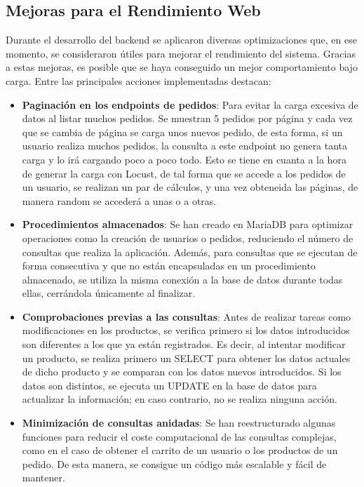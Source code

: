 \documentclass[10pt]{book}
\begin{document}
\subsection{Mejoras para el Rendimiento Web}
Durante el desarrollo del backend se aplicaron diversas optimizaciones que, en ese momento, se consideraron útiles para mejorar el rendimiento del sistema. Gracias a estas mejoras, es posible que se haya conseguido un mejor comportamiento bajo carga. Entre las principales acciones implementadas destacan:

\begin{itemize}
    \item \textbf{Paginación en los endpoints de pedidos}: Para evitar la carga excesiva de datos al listar muchos pedidos. Se muestran 5 pedidos por página y cada vez que se cambia de página se carga unos nuevos pedido, de esta forma, si un usuario realiza muchos pedidos, la consulta a este endpoint no genera tanta carga y lo irá cargando poco a poco todo. Esto se tiene en cuanta a la hora de generar la carga con Locust, de tal forma que se accede a los pedidos de un usuario, se realizan un par de cálculos, y una vez obteneida las páginas, de manera random se accederá a unas o a otras.
    \item \textbf{Procedimientos almacenados}: Se han creado en MariaDB para optimizar operaciones como la creación de usuarios o pedidos, reduciendo el número de consultas que realiza la aplicación. Además, para consultas que se ejecutan de forma consecutiva y que no están encapsuladas en un procedimiento almacenado, se utiliza la misma conexión a la base de datos durante todas ellas, cerrándola únicamente al finalizar.
    \item \textbf{Comprobaciones previas a las consultas}: Antes de realizar tareas como modificaciones en los productos, se verifica primero si los datos introducidos son diferentes a los que ya están registrados. Es decir, al intentar modificar un producto, se realiza primero un SELECT para obtener los datos actuales de dicho producto y se comparan con los datos nuevos introducidos. Si los datos son distintos, se ejecuta un UPDATE en la base de datos para actualizar la información; en caso contrario, no se realiza ninguna acción.
    \item \textbf{Minimización de consultas anidadas}: Se han reestructurado algunas funciones para reducir el coste computacional de las consultas complejas, como en el caso de obtener el carrito de un usuario o los productos de un pedido. De esta manera, se consigue un código más escalable y fácil de mantener.
\end{itemize}
\end{document}
